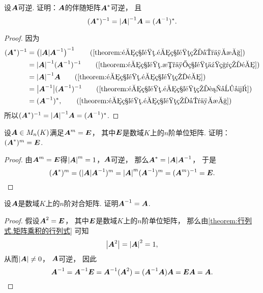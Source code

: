 \begin{example}\label{theorem:逆矩阵.伴随矩阵的逆与逆矩阵的伴随}
设\(\boldsymbol{A}\)可逆.
证明：\(\boldsymbol{A}\)的伴随矩阵\(\boldsymbol{A}^*\)可逆，
且\begin{equation}
	(\boldsymbol{A}^*)^{-1}
	= \abs{\boldsymbol{A}}^{-1} \boldsymbol{A}
	= (\boldsymbol{A}^{-1})^*.
\end{equation}
\begin{proof}
因为\begin{align*}
	(\vb{A}^*)^{-1}
	&= \left( \abs{\vb{A}} \vb{A}^{-1} \right)^{-1}
		\tag{\cref{theorem:逆矩阵.逆矩阵的唯一性}} \\
	&= \abs{\vb{A}}^{-1} (\vb{A}^{-1})^{-1}
		\tag{\cref{theorem:逆矩阵.数与矩阵乘积的逆}} \\
	&= \abs{\vb{A}}^{-1} \vb{A}
		\tag{\cref{theorem:逆矩阵.逆矩阵的逆}} \\
	&= \abs{\vb{A}^{-1}} (\vb{A}^{-1})^{-1}
		\tag{\cref{theorem:逆矩阵.逆矩阵的行列式}} \\
	&= (\vb{A}^{-1})^*,
		\tag{\cref{theorem:逆矩阵.逆矩阵的唯一性}}
\end{align*}
所以\((\boldsymbol{A}^*)^{-1}
= \abs{\boldsymbol{A}}^{-1} \boldsymbol{A}
= (\boldsymbol{A}^{-1})^*\).
\end{proof}
\end{example}
\begin{example}
设\(\boldsymbol{A} \in M_n(K)\)满足\(\boldsymbol{A}^m = \boldsymbol{E}\)，
其中\(\boldsymbol{E}\)是数域\(K\)上的\(n\)阶单位矩阵.
证明：\((\boldsymbol{A}^*)^m = \boldsymbol{E}\).
\begin{proof}
由\(\boldsymbol{A}^m = \boldsymbol{E}\)得\(\abs{\boldsymbol{A}}^m = 1\)，\(\boldsymbol{A}\)可逆，
那么\(\boldsymbol{A}^* = \abs{\boldsymbol{A}} \boldsymbol{A}^{-1}\)，
于是\[
	(\boldsymbol{A}^*)^m
	= (\abs{\boldsymbol{A}} \boldsymbol{A}^{-1})^m
	= \abs{\boldsymbol{A}}^m (\boldsymbol{A}^{-1})^m
	= (\boldsymbol{A}^m)^{-1}
	= \boldsymbol{E}.
	\qedhere
\]
\end{proof}
\end{example}

\begin{example}\label{example:对合矩阵.对合矩阵的逆矩阵}
设\(\boldsymbol{A}\)是数域\(K\)上的\(n\)阶对合矩阵.
证明\(\boldsymbol{A}^{-1} = \boldsymbol{A}\).
\begin{proof}
假设\(\boldsymbol{A}^2=\boldsymbol{E}\)，
其中\(\boldsymbol{E}\)是数域\(K\)上的\(n\)阶单位矩阵，
那么由\cref{theorem:行列式.矩阵乘积的行列式} 可知\[
	\abs{\boldsymbol{A}^2}
	= \abs{\boldsymbol{A}}^2
	= 1,
\]
从而\(\abs{\boldsymbol{A}}\neq0\)，
\(\boldsymbol{A}\)可逆，
因此\[
	\boldsymbol{A}^{-1}
	= \boldsymbol{A}^{-1}\boldsymbol{E}
	= \boldsymbol{A}^{-1}(\boldsymbol{A}^2)
	= (\boldsymbol{A}^{-1}\boldsymbol{A})\boldsymbol{A}
	= \boldsymbol{E}\boldsymbol{A}
	= \boldsymbol{A}.
	\qedhere
\]
\end{proof}
\end{example}

